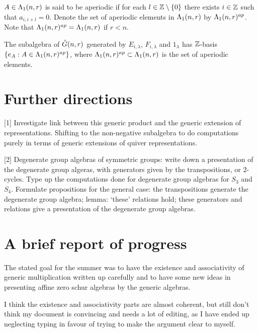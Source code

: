 \documentclass[a4paper, 11pt]{report}
\begin{document}
$A\in\Lambda_1(n,r)$ is said to be aperiodic if for each $l\in\mathbb{Z}\setminus\{0\}$ there exists $i\in\mathbb{Z}$ such that $a_{i,i+l}=0$. Denote the set of aperiodic elements in $\Lambda_1(n,r)$ by $\Lambda_1(n,r)^{ap}$. Note that $\Lambda_1(n,r)^{ap}=\Lambda_1(n,r)$ if $r<n$.


\begin{proposition}
The subalgebra of $\hat{G}(n,r)$ generated by $E_{i,\lambda}$, $F_{i,\lambda}$ and $1_\lambda$ has $\mathbb{Z}$-basis $\{e_A:A\in\Lambda_1(n,r)^{ap}\}$, where $\Lambda_1(n,r)^{ap}\subset\Lambda_1(n,r)$ is the set of aperiodic elements.
\end{proposition}







\chapter{Further directions}

[1] Investigate link between this generic product and the generic extension of representations. Shifting to the non-negative subalgebra to do computations purely in terms of generic extensions of quiver representations.

[2] Degenerate group algebras of symmetric groups: write down a presentation of the degenerate group algeras, with generators given by the transpositions, or $2$-cycles. Type up the computations done for degenerate group algebras for $S_3$ and $S_4$. Formulate propositions for the general case: the transpositions generate the degenerate group algebra; lemma: `these' relations hold; these generators and relations give a presentation of the degenerate group algebras.

\chapter{A brief report of progress}

The stated goal for the summer was to have the existence and associativity of generic multiplication written up carefully and to have some new ideas in presenting affine zero schur algebras by the generic algebras.

I think the existence and associativity parts are almost coherent, but still don't think my document is convincing and needs a lot of editing, as I have ended up neglecting typing in favour of trying to make the argument clear to myself.
\end{document}
